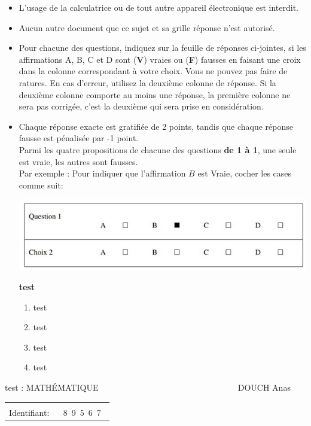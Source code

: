\documentclass{book}%
\begin{document}
\begin{itemize}%
\item%
L'usage de la calculatrice ou de tout autre appareil électronique est interdit.%
\item%
Aucun autre document que ce sujet et sa grille réponse n'est autorisé.%
\item%
Pour chacune des questions, indiquez sur la feuille de réponses ci-jointes, si les affirmations A, B, C et D sont (\textbf{V}) vraies ou (\textbf{F}) fausses en faisant une croix dans la colonne correspondant à votre choix. Vous ne pouvez pas faire de ratures. En cas d'erreur, utilisez la deuxième colonne de réponse. Si la deuxième colonne comporte au moins une réponse, la première colonne ne sera pas corrigée, c'est la deuxième qui sera prise en considération.%
\item%
Chaque réponse exacte est gratifiée de 2 points, tandis que chaque réponse fausse est pénalisée par -1 point. \\ 	Parmi les quatre propositions de chacune des questions \textbf{de 1 à 1}, une seule est vraie, les autres sont fausses. \\ 	Par exemple : Pour indiquer que l'affirmation $B$ est Vraie, cocher les cases comme suit:  \\ \begin{center}	\includegraphics[scale=0.8]{reponses.png} \end{center}%
\thispagestyle{empty}%
\begin{exercise}%
\textbf{test }%
\begin{enumerate}[label=\textbf{\Alph*. }]%
\item%
test%
\item%
test%
\item%
test%
\item%
test%
\end{enumerate}%
\end{exercise}%
\end{itemize}%
\newpage%
\thispagestyle{empty}%
test : MATHÉMATIQUE $\qquad \qquad \qquad \qquad \qquad \qquad \qquad \qquad$ DOUCH Anas%
\begin{flushright}%
\begin{tabular}{|l|}%
\hline%
 \\%
\thispagestyle{empty}%
Identifiant: $\quad$ {\Large 8~9~5~6~7~}%
 \\%
\hline%
\end{tabular}%
\end{flushright}%
\end{document}
